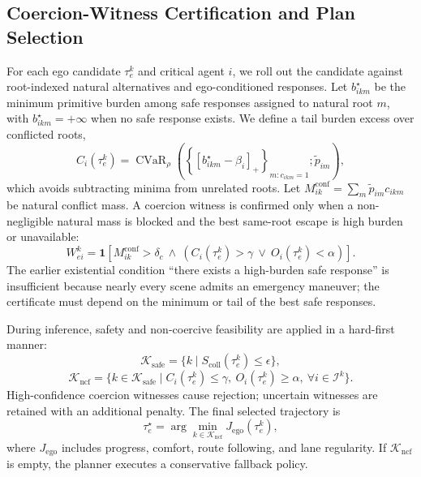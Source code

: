 \documentclass[10pt]{article}
\begin{document}
\subsection{Coercion-Witness Certification and Plan Selection}
\label{sec:method_certification}

For each ego candidate $\tau^k_e$ and critical agent $i$, we roll out the candidate against root-indexed natural alternatives and ego-conditioned responses. Let $b^{\star}_{ikm}$ be the minimum primitive burden among safe responses assigned to natural root $m$, with $b^{\star}_{ikm}=+\infty$ when no safe response exists. We define a tail burden excess over conflicted roots,
\begin{equation}
    C_i(\tau^k_e)
    =\operatorname{CVaR}_{\rho}
    \left(
      \left\{[b^{\star}_{ikm}-\beta_i]_+\right\}_{m:c_{ikm}=1};
      \widetilde p_{im}
    \right),
\end{equation}
which avoids subtracting minima from unrelated roots. Let $M^{\mathrm{conf}}_{ik}=\sum_m\widetilde p_{im}c_{ikm}$ be natural conflict mass. A coercion witness is confirmed only when a non-negligible natural mass is blocked and the best same-root escape is high burden or unavailable:
\begin{equation}
    W^k_{ei}=\mathbf{1}
    \left[
      M^{\mathrm{conf}}_{ik}>\delta_c
      \ \wedge\
      \left(C_i(\tau^k_e)>\gamma\ \vee\ O_i(\tau^k_e)<\alpha\right)
    \right].
    \label{eq:witness}
\end{equation}
The earlier existential condition ``there exists a high-burden safe response'' is insufficient because nearly every scene admits an emergency maneuver; the certificate must depend on the minimum or tail of the best safe responses.

During inference, safety and non-coercive feasibility are applied in a hard-first manner:
\begin{equation}
    \mathcal{K}_{\mathrm{safe}}
    =
    \{k \mid S_{\mathrm{coll}}(\tau^k_e)\le \epsilon \},
\end{equation}
\begin{equation}
    \mathcal{K}_{\mathrm{ncf}}
    =
    \{k\in\mathcal{K}_{\mathrm{safe}}
    \mid
    C_i(\tau^k_e)\le \gamma,\ 
    O_i(\tau^k_e)\ge \alpha,\ 
    \forall i\in\mathcal{I}^k
    \}.
\end{equation}
High-confidence coercion witnesses cause rejection; uncertain witnesses are retained with an additional penalty. The final selected trajectory is
\begin{equation}
    \tau^\star_e
    =
    \arg\min_{k\in\mathcal{K}_{\mathrm{ncf}}}
    J_{\mathrm{ego}}(\tau^k_e),
\end{equation}
where $J_{\mathrm{ego}}$ includes progress, comfort, route following, and lane regularity. If $\mathcal{K}_{\mathrm{ncf}}$ is empty, the planner executes a conservative fallback policy.
\end{document}
